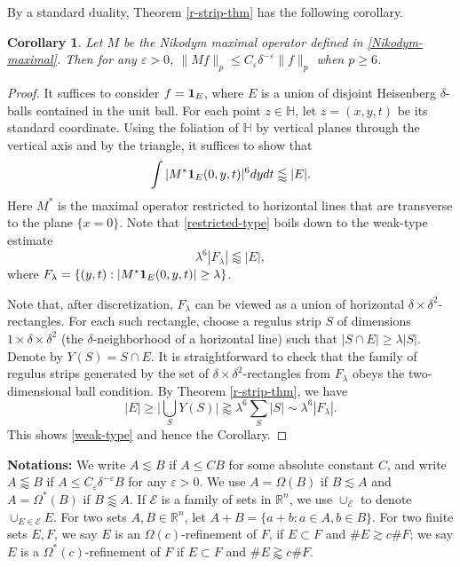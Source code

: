\documentclass{amsart}%
\numberwithin{equation}{section}
\newtheorem{corollary}[theorem]{Corollary}
\newcommand{\de}{\delta}
\newcommand{\e}{\varepsilon}
\newcommand{\la}{\lambda}
\newcommand{\Om}{\Omega}
\newcommand{\ce}{\mathcal E}
\newcommand{\ZR}{\mathbb{R}}
\newcommand{\Id}{{\bf{1}}}
\newcommand{\1}{\mathbbm{1}}
\newcommand{\ZH}{\mathbb H}
\begin{document}
By a standard duality, Theorem \ref{r-strip-thm} has the following corollary.
\begin{corollary}
Let $M$ be the Nikodym maximal operator defined in \eqref{Nikodym-maximal}. 
Then for any $\e>0$, $\|Mf\|_p\leq C_\e\de^{-\e}\|f\|_p$ when $p\geq6$.
\end{corollary}
\begin{proof}
It suffices to consider $f=\Id_E$, where $E$ is a union of disjoint Heisenberg $\delta$-balls contained in the unit ball.
For each point $z\in\ZH$, let $z=(x,y,t)$ be its standard coordinate.
Using the foliation of $\ZH$ by vertical planes through the vertical axis and by the triangle, it suffices to show that
\begin{equation}
\label{restricted-type}
    \int |M^\ast\Id_E(0,y,t)|^6dydt\lessapprox |E|.
\end{equation}
Here $M^\ast$ is the maximal operator restricted to horizontal lines that are transverse to the plane $\{x=0\}$.
Note that \eqref{restricted-type} boils down to the weak-type estimate
\begin{equation}
\label{weak-type}
    \lambda^6|F_\lambda|\lessapprox|E|,
\end{equation}
where $F_\lambda=\{(y,t): |M^\ast\Id_E(0,y,t)|\geq\lambda\}$.

Note that, after discretization, $F_\lambda$ can be viewed as a union of horizontal $\delta\times\delta^2$-rectangles.
For each such rectangle, choose a regulus strip $S$ of dimensions $1\times\delta\times\delta^2$ (the $\delta$-neighborhood of a horizontal line) such that $|S\cap E|\geq \lambda |S|$.
Denote by $Y(S)=S\cap E$.
It is straightforward to check that the family of regulus strips generated by the set of $\delta\times\delta^2$-rectangles from $F_\lambda$ obeys the two-dimensional ball condition.
By Theorem \ref{r-strip-thm}, we have
\begin{equation}
    |E|\geq\Big|\bigcup_{S}Y(S)\Big|\gtrapprox\la^6\sum_{S}|S|\sim\lambda^6|F_\lambda|.
\end{equation}
This shows \eqref{weak-type} and hence the Corollary.
\qedhere


\end{proof}


\medskip


{\bf Notations:}  We write $A\lesssim B$ if $A\leq CB$ for some absolute constant $C$, and write $A\lessapprox B$ if $A\leq C_\e\de^{-\e}B$ for any $\e>0$. 
We use $A=\Om(B)$ if $B\lesssim A$ and $A=\Om^\ast(B)$ if $B\lessapprox A$.
If $\ce$ is a family of sets in $\ZR^n$, we use $\cup_\ce$ to denote $\cup_{E\in\ce}E$.
For two sets $A,B\in\ZR^n$, let $A+B=\{a+b:a\in A, b\in B\}$. 
For two finite sets $E,F$, we say $E$ is an $\Omega(c)$-refinement of $F$, if $E\subset F$ and $\#E\gtrsim c\#F$; we say $E$ is a $\Omega^\ast(c)$-refinement of $F$ if $E\subset F$ and  $\#E\gtrapprox c\#F$.
\end{document}
